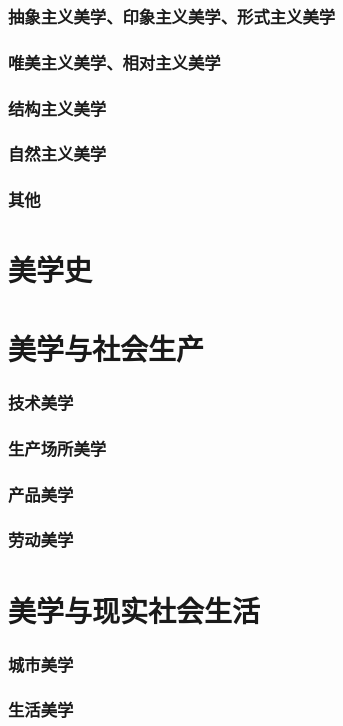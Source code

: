 \documentclass[UTF8]{../RepresentationUniverse}
\begin{document}
    \subsubsection{抽象主义美学、印象主义美学、形式主义美学}
    \subsubsection{唯美主义美学、相对主义美学}
    \subsubsection{结构主义美学}
    \subsubsection{自然主义美学}
    \subsubsection{其他}

\section{美学史}

\section{美学与社会生产}
    \subsubsection{技术美学}
    \subsubsection{生产场所美学}
    \subsubsection{产品美学}
    \subsubsection{劳动美学}
\section{美学与现实社会生活}
    \subsubsection{城市美学}
    \subsubsection{生活美学}
\end{document}
